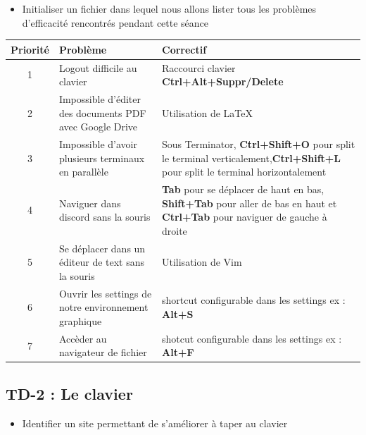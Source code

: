 \documentclass[12pt]{article}
\begin{document}
\begin{itemize}
	\item Initialiser un fichier dans lequel nous allons lister tous les problèmes d'efficacité rencontrés pendant cette séance
\end{itemize}
\vspace{0.3cm}

\begin{tabular}{|c|p{5cm}|p{10cm}|}
	\hline
	\textbf{Priorité} & \textbf{Problème} & \textbf{Correctif}\\ 
	\hline
	1 & Logout difficile au clavier & Raccourci clavier \textbf{Ctrl+Alt+Suppr/Delete}\\
	\hline
	2 & Impossible d'éditer des documents PDF avec Google Drive & Utilisation de LaTeX\\
	\hline
	3 & Impossible d'avoir plusieurs terminaux en parallèle & Sous Terminator, \textbf{Ctrl+Shift+O} pour split le terminal verticalement,\newline \textbf{Ctrl+Shift+L} pour split le terminal horizontalement\\ 
	\hline
	4 & Naviguer dans discord sans la souris & \textbf{Tab} pour se déplacer de haut en bas, \textbf{Shift+Tab} pour aller de bas en haut \newline et \textbf{Ctrl+Tab} pour naviguer de gauche à droite\\
	\hline 
	5 & Se déplacer dans un éditeur de text sans la souris & Utilisation de Vim\\
	\hline
	6 & Ouvrir les settings de notre environnement graphique & shortcut configurable dans les settings ex : \textbf{Alt+S}\\
	\hline
	7 & Accèder au navigateur de fichier & shotcut configurable dans les settings ex : \textbf{Alt+F}\\
	\hline
\end{tabular}

\vspace{0.3cm}
	\subsection{TD-2 : Le clavier}
\begin{itemize}
	\item Identifier un site permettant de s'améliorer à taper au clavier
\end{itemize}
\end{document}

